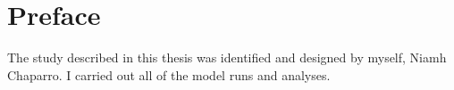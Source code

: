 
\chapter{Preface}

The study described in this thesis was identified and designed by myself, Niamh Chaparro.
I carried out all of the model runs and analyses.
